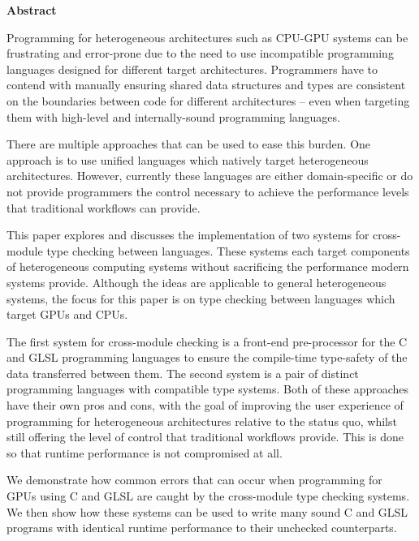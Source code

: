 \newpage
{\Huge \bf Abstract}
\vspace{24pt}






Programming for heterogeneous architectures such as CPU-GPU systems can be
frustrating and error-prone due to the need to use incompatible programming
languages designed for different target architectures. Programmers have to
contend with manually ensuring shared data structures and types are consistent
on the boundaries between code for different architectures -- even when
targeting them with high-level and internally-sound programming languages.

There are multiple approaches that can be used to ease this burden. One
approach is to use unified languages which natively target heterogeneous
architectures. However, currently these languages are either domain-specific or
do not provide programmers the control necessary to achieve the performance
levels that traditional workflows can provide.

This paper explores and discusses the implementation of two systems for
cross-module type checking between languages. These systems each target
components of heterogeneous computing systems without sacrificing the
performance modern systems provide. Although the ideas are applicable to
general heterogeneous systems, the focus for this paper is on type checking
between languages which target GPUs and CPUs.

The first system for cross-module checking is a front-end pre-processor for the
C and GLSL programming languages to ensure the compile-time type-safety of the
data transferred between them. The second system is a pair of distinct
programming languages with compatible type systems. Both of these approaches
have their own pros and cons, with the goal of improving the user experience of
programming for heterogeneous architectures relative to the status quo, whilst
still offering the level of control that traditional workflows provide. This is
done so that runtime performance is not compromised at all.

We demonstrate how common errors that can occur when programming for GPUs using
C and GLSL are caught by the cross-module type checking systems. We then show
how these systems can be used to write many sound C and GLSL programs with
identical runtime performance to their unchecked counterparts.

\newpage
\vspace*{\fill}
